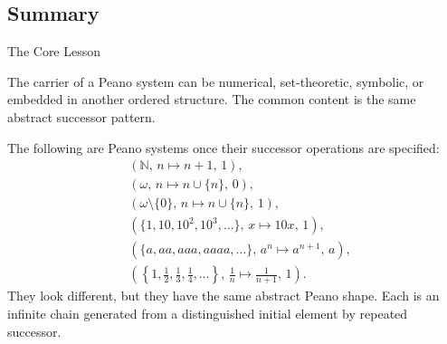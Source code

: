 \subsection*{Summary}

\begin{topicbox}{The Core Lesson}
\begin{exposition}
The carrier of a Peano system can be numerical, set-theoretic, symbolic, or
embedded in another ordered structure. The common content is the same abstract
successor pattern.
\end{exposition}

\begin{remark*}[Examples]
The following are Peano systems once their successor operations are specified:
\[
\begin{aligned}
&(\mathbb{N},\,n\mapsto n+1,\,1),\\
&(\omega,\,n\mapsto n\cup\{n\},\,0),\\
&(\omega\setminus\{0\},\,n\mapsto n\cup\{n\},\,1),\\
&(\{1,10,10^2,10^3,\ldots\},\,x\mapsto 10x,\,1),\\
&(\{a,aa,aaa,aaaa,\ldots\},\,a^n\mapsto a^{n+1},\,a),\\
&\left(\left\{1,\frac{1}{2},\frac{1}{3},\frac{1}{4},\ldots\right\},
\,\frac{1}{n}\mapsto \frac{1}{n+1},\,1\right).
\end{aligned}
\]
They look different, but they have the same abstract Peano shape. Each is an
infinite chain generated from a distinguished initial element by repeated
successor.
\end{remark*}
\end{topicbox}

